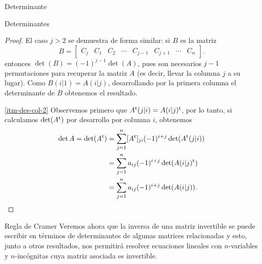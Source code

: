 \begin{chapter}{Determinante}
\begin{section}{Determinantes}
\begin{proof}
            El caso $j>2$  se demuestra de forma similar: si $B$ es la matriz
            $$
            B = \begin{bmatrix} C_j &C_1 &C_2 &\cdots& C_{j-1}&C_{j+1}&\cdots &C_n\end{bmatrix}.
            $$        
            entonces $\det(B)=(-1)^{j-1}\det(A)$, pues son necesarios $j-1$ permutaciones para recuperar la matriz $A$ (es decir, llevar la columna $j$ a su lugar).
            Como $B(i|1) = A(i|j)$,  desarrollando por la primera columna el determinante de $B$ obtenemos el resultado.  
            
            
            \ref{itm-des-col-2} Observemos primero que $A^{\operatorname{t}}(j|i) = A(i|j)^{\operatorname{t}}$, por lo tanto, si calculamos $\det(A^{\operatorname{t}})$ por desarrollo por columna $i$, obtenemos 
            \begin{align*}
            \det A = \det(A^{\operatorname{t}})&=\sum_{j=1}^{n} [A^{\operatorname{t}}]_{ji} (-1)^{i+j}\det (A^{\operatorname{t}}(j|i)) \\
            &=  \sum_{j=1}^{n} a_{ij} (-1)^{i+j}\det (A(i|j)^{\operatorname{t}}) \\
            &= \sum_{j=1}^{n} a_{ij} (-1)^{i+j}\det (A(i|j)).
            \end{align*}
        \end{proof}
        
    \end{section}

    \begin{section}{Regla de Cramer}\label{seccion-regla-de-cramer} Veremos ahora que la inversa de una matriz invertible se puede escribir en términos de determinantes de algunas matrices relacionadas y esto, junto a otros resultados, nos permitirá resolver ecuaciones lineales con $n$-variables y $n$-incógnitas cuya matriz asociada es invertible.  
                

\end{section}
\end{chapter}
